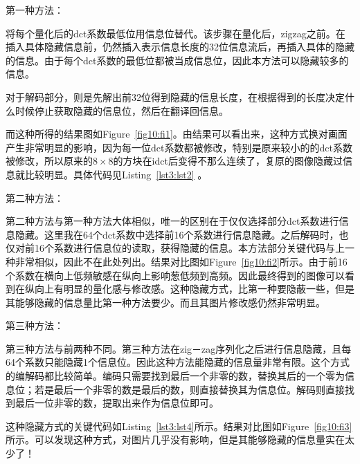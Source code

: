 \documentclass[a4paper]{article}
\begin{document}
		第一种方法：
		
		将每个量化后的dct系数最低位用信息位替代。该步骤在量化后，zigzag之前。在插入具体隐藏信息前，仍然插入表示信息长度的32位信息流后，再插入具体的隐藏的信息。由于每个dct系数的最低位都被当成信息位，因此本方法可以隐藏较多的信息。
		
		对于解码部分，则是先解出前32位得到隐藏的信息长度，在根据得到的长度决定什么时候停止获取隐藏的信息位，然后在翻译回信息。
		
		而这种所得的结果图如Figure~\ref{fig10:fi1}。由结果可以看出来，这种方式换对画面产生非常明显的影响，因为每一位dct系数都被修改，特别是原来较小的的dct系数被修改，所以原来的$ 8 \times 8$的方块在idct后变得不那么连续了，复原的图像隐藏过信息就比较明显。具体代码见Listing~\ref{lst3:lst2} 。
		
		
		
		第二种方法：
		
		第二种方法与第一种方法大体相似，唯一的区别在于仅仅选择部分dct系数进行信息隐藏。这里我在64个dct系数中选择前16个系数进行信息隐藏。之后解码时，也仅对前16个系数进行信息位的读取，获得隐藏的信息。本方法部分关键代码与上一种非常相似，因此不在此处列出。结果对比图如Figure~\ref{fig10:fi2}所示。由于前16个系数在横向上低频敏感在纵向上影响葱低频到高频。因此最终得到的图像可以看到在纵向上有明显的量化感与修改感。这种隐藏方式，比第一种要隐蔽一些，但是其能够隐藏的信息量比第一种方法要少。而且其图片修改感仍然非常明显。
		
		第三种方法：
		
		第三种方法与前两种不同。第三种方法在zig－zag序列化之后进行信息隐藏，且每64个系数只能隐藏1个信息位。因此这种方法能隐藏的信息量非常有限。这个方式的编解码都比较简单。编码只需要找到最后一个非零的数，替换其后的一个零为信息位；若是最后一个非零的数是最后的数，则直接替换其为信息位。解码则直接找到最后一位非零的数，提取出来作为信息位即可。
		
		这种隐藏方式的关键代码如Listing~\ref{lst3:lst4}所示。结果对比图如Figure~\ref{fig10:fi3}所示。可以发现这种方式，对图片几乎没有影响，但是其能够隐藏的信息量实在太少了！
		
		
		
\end{document}
